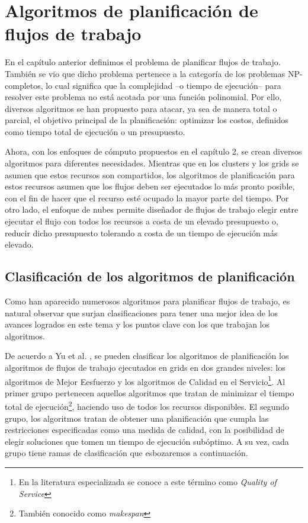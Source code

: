 \chapter{Algoritmos de planificación de flujos de trabajo}
En el capítulo anterior definimos el problema de planificar flujos de trabajo. También se vio que dicho problema pertenece a la categoría de los problemas NP-completos, lo cual significa que la complejidad --o tiempo de ejecución-- para resolver este problema no está acotada por una función polinomial. Por ello, diversos algoritmos se han propuesto para atacar, ya sea de manera total o parcial, el objetivo principal de la planificación: optimizar los costos, definidos como tiempo total de ejecución o un presupuesto.

Ahora, con los enfoques de cómputo propuestos en el capítulo 2, se crean diversos algoritmos para diferentes necesidades. Mientras que en los clusters y los grids se asumen que estos recursos son compartidos, los algoritmos de planificación para estos recursos asumen que los flujos deben ser ejecutados lo más pronto posible, con el fin de hacer que el recurso esté ocupado la mayor parte del tiempo. Por otro lado, el enfoque de nubes permite diseñador de flujos de trabajo elegir entre ejecutar el flujo con todos los recursos a costa de un elevado presupuesto o, reducir dicho presupuesto tolerando a costa de un tiempo de ejecución más elevado.

\section{Clasificación de los algoritmos de planificación}
Como han aparecido numerosos algoritmos para planificar flujos de trabajo, es natural observar que surjan clasificaciones \cite{topcuoglu2002performance} \cite{yu2008workflow} para tener una mejor idea de los avances logrados en este tema y los puntos clave con los que trabajan los algoritmos.

De acuerdo a Yu et al. \cite{yu2008workflow}, se pueden clasificar los algoritmos de planificación los algoritmos de flujos de trabajo ejecutados en grids en dos grandes niveles: los algoritmos de Mejor Eesfuerzo y los algoritmos de Calidad en el Servicio\footnote{En la literatura especializada se conoce a este término como \emph{Quality of Service}}. Al primer grupo pertenecen aquellos algoritmos que tratan de minimizar el tiempo total de ejecución\footnote{También conocido como \emph{makespan}}, haciendo uso de todos los recursos disponibles. El segundo grupo, los algoritmos tratan de obtener una planificación que cumpla las restricciones especificadas como una medida de calidad, con la posibilidad de elegir soluciones que tomen un tiempo de ejecución subóptimo. A su vez, cada grupo tiene ramas de clasificación que esbozaremos a continuación.

